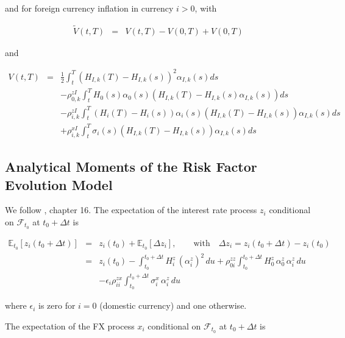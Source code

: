 \documentclass[12pt, a4paper]{article}
\begin{document}
{{\begin{appendix}
and for foreign currency inflation in currency $i>0$, with

\begin{eqnarray*}
  \tilde{V}(t,T) &=& V(t,T) -V(0,T) + V(0,T)
\end{eqnarray*}

and

\begin{eqnarray*}
  V(t,T) &=& \frac{1}{2}\int_t^T (H_{I,k}(T)-H_{I,k}(s))^2 \alpha_{I,k}(s) ds \\
  & & -\rho^{zI}_{0,k} \int_t^T H_0(s)\alpha_0(s)(H_{I,k}(T)-H_{I,k}(s)\alpha_{I,k}(s)) ds \\
  & & -\rho^{zI}_{i,k} \int_t^T (H_i(T)-H_i(s))\alpha_i(s)(H_{I,k}(T)-H_{I,k}(s))\alpha_{I,k}(s) ds \\
  & & +\rho^{xI}_{i,k} \int_t^T \sigma_i(s)(H_{I,k}(T)-H_{I,k}(s))\alpha_{I,k}(s) ds
\end{eqnarray*}

\subsection{Analytical Moments of the Risk Factor Evolution Model}\label{sec:app_analytical_moments}

We follow \cite{Lichters}, chapter 16. The expectation of the interest rate process $z_i$ conditional on $\mathcal{F}_{t_0}$ at $t_0+\Delta t$ is

\begin{eqnarray*}
  \mathbb{E}_{t_0}[z_i(t_0+\Delta t)] &=& z_i(t_0) + \mathbb{E}_{t_0}[\Delta z_i],
  \qquad\mbox{with}\quad \Delta z_i = z_i(t_0+\Delta t) - z_i(t_0) \\
  &=& z_i(t_0) -\int_{t_0}^{t_0+\Delta t} H^z_i\,(\alpha^z_i)^2\,du + \rho^{zz}_{0i} \int_{t_0}^{t_0+\Delta t}
  H^z_0\,\alpha^z_0\,\alpha^z_i\,du \\
  & & - \epsilon_i  \rho^{zx}_{ii}\int_{t_0}^{t_0+\Delta t} \sigma_i^x\,\alpha^z_i\,du
\end{eqnarray*}

where $\epsilon_i$ is zero for $i=0$ (domestic currency) and one otherwise.

\bigskip

The expectation of the FX process $x_i$ conditional on $\mathcal{F}_{t_0}$ at $t_0+\Delta t$ is


\end{appendix}}}
\end{document}
